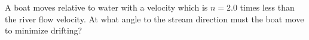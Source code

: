 
\item A boat moves relative to water with a velocity which is \( n = 2.0 \) times less than the river flow velocity. At what angle to the stream direction must the boat move to minimize drifting?
